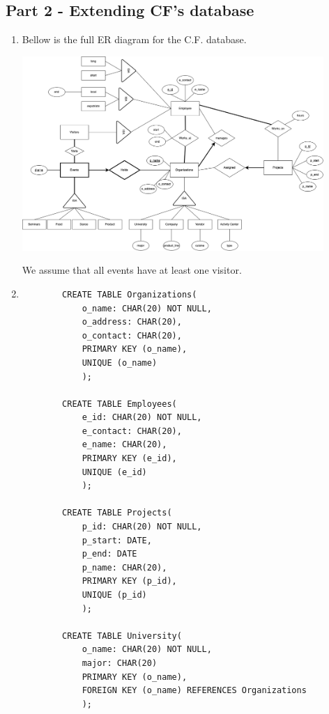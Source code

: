 \subsection*{Part 2 - Extending CF's database}

\begin{enumerate}[label = {(\alph*)}]
    \item Bellow is the full ER diagram for the C.F. database.
    
    \begin{center}
        \includegraphics[width=0.9\textwidth]{img/2a.png}
    \end{center}
    \noindent We assume that all events have at least one visitor.
    
    \item 
    \begin{verbatim}
        CREATE TABLE Organizations(
            o_name: CHAR(20) NOT NULL,
            o_address: CHAR(20),
            o_contact: CHAR(20),
            PRIMARY KEY (o_name),
            UNIQUE (o_name)
            );
        
        CREATE TABLE Employees(
            e_id: CHAR(20) NOT NULL,
            e_contact: CHAR(20),
            e_name: CHAR(20),
            PRIMARY KEY (e_id),
            UNIQUE (e_id)
            );
            
        CREATE TABLE Projects(
            p_id: CHAR(20) NOT NULL,
            p_start: DATE,
            p_end: DATE
            p_name: CHAR(20),
            PRIMARY KEY (p_id),
            UNIQUE (p_id)
            );
        
        CREATE TABLE University(
            o_name: CHAR(20) NOT NULL,
            major: CHAR(20)
            PRIMARY KEY (o_name),
            FOREIGN KEY (o_name) REFERENCES Organizations 
            );
        

\end{verbatim}
\end{enumerate}
